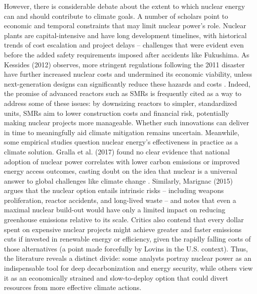 \documentclass[11,5 pt]{article}
\begin{document}
However, there is considerable debate about the extent to which nuclear energy can and should contribute to climate goals. A number of scholars point to economic and temporal constraints that may limit nuclear power’s role. Nuclear plants are capital-intensive and have long development timelines, with historical trends of cost escalation and project delays – challenges that were evident even before the added safety requirements imposed after accidents like Fukushima. As Kessides (2012) observes, more stringent regulations following the 2011 disaster have further increased nuclear costs and undermined its economic viability, unless next-generation designs can significantly reduce these hazards and costs \cite{KESSIDES2012185}. Indeed, the promise of advanced reactors such as SMRs is frequently cited as a way to address some of these issues: by downsizing reactors to simpler, standardized units, SMRs aim to lower construction costs and financial risk, potentially making nuclear projects more manageable. Whether such innovations can deliver in time to meaningfully aid climate mitigation remains uncertain. Meanwhile, some empirical studies question nuclear energy’s effectiveness in practice as a climate solution. Gralla et al. (2017) found no clear evidence that national adoption of nuclear power correlates with lower carbon emissions or improved energy access outcomes, casting doubt on the idea that nuclear is a universal answer to global challenges like climate change \cite{GRALLA20171251}. Similarly, Marignac (2015) argues that the nuclear option entails intrinsic risks – including weapons proliferation, reactor accidents, and long-lived waste – and notes that even a maximal nuclear build-out would have only a limited impact on reducing greenhouse emissions relative to its scale. Critics also contend that every dollar spent on expensive nuclear projects might achieve greater and faster emissions cuts if invested in renewable energy or efficiency, given the rapidly falling costs of those alternatives (a point made forcefully by Lovins \cite{LOVINS2022107122} in the U.S. context). Thus, the literature reveals a distinct divide: some analysts portray nuclear power as an indispensable tool for deep decarbonization and energy security, while others view it as an economically strained and slow-to-deploy option that could divert resources from more effective climate actions.
\end{document}
